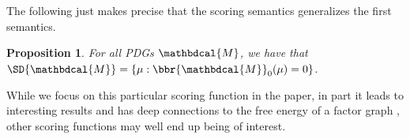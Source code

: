 \documentclass{article}
\theoremstyle{plain}
\newtheorem{prop}[theorem]{Proposition}
\theoremstyle{definition}
\theoremstyle{remark}
\newcommand{\dg}[1]{\mathbdcal{#1}}
\newcommand\Inc{\mathit{Inc}}
\numberwithin{equation}{section}
\begin{document}
        The following just makes precise that the scoring semantics
        generalizes the first semantics.
	\begin{prop}\label{prop:sd-is-zeroset}
For all PDGs $\dg M$, we have that $\SD{\dg M} = \{ \mu : \bbr{\dg
          M}_0(\mu) = 0\}$. 
\end{prop}
          
While we focus on this particular scoring function
in the paper, 
in part
it leads to interesting results and has deep
connections to the free energy of a factor graph \cite{KF09},
other scoring functions may well end up being of interest. 
        
	
\end{document}
